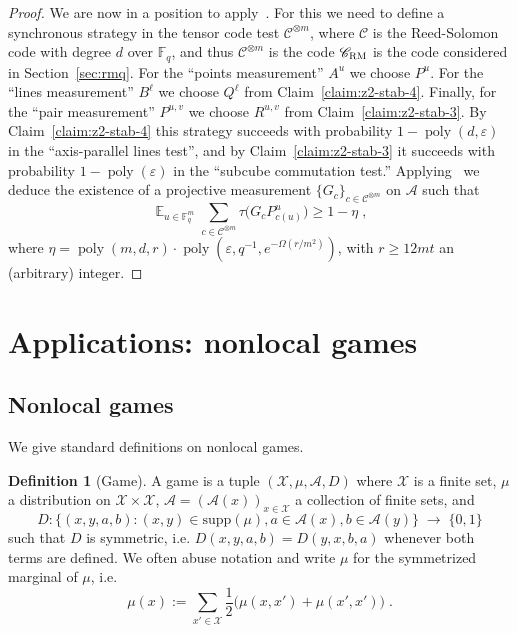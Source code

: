 \documentclass[11pt]{article}
\theoremstyle{definition}
\newtheorem{definition}[theorem]{Definition}
\newcommand{\code}{\mathscr{C}}
\DeclareMathOperator*{\Expectation}{\mathbb{E}}
\newcommand{\Es}[1]{\Expectation_{#1}}
\newcommand{\F}{\ensuremath{\mathbb{F}}}
\newcommand{\mA}{\ensuremath{\mathcal{A}}}
\newcommand{\mX}{\ensuremath{\mathcal{X}}}
\newcommand{\RM}{\ensuremath{\textsc{RM}}}
\DeclareMathOperator{\poly}{poly}
\newcommand{\eps}{\varepsilon}
\begin{document}
\begin{proof}
We are now in a position to apply~\cite[Theorem 4.1]{ji2022quantum}. For this we need to define a synchronous strategy in the tensor code test $\code^{\otimes m}$, where $\code$ is the Reed-Solomon code with degree $d$ over $\F_q$, and thus $\code^{\otimes m}$ is the code $\code_\RM$ is the code considered in Section~\ref{sec:rmq}. For the ``points measurement'' $A^u$ we choose $P^u$. For the ``lines measurement'' $B^\ell$ we choose $Q^\ell$ from Claim~\ref{claim:z2-stab-4}. Finally, for the ``pair measurement'' $P^{u,v}$ we choose $R^{u,v}$ from Claim~\ref{claim:z2-stab-3}. By Claim~\ref{claim:z2-stab-4} this strategy succeeds with probability $1-\poly(d,\eps)$ in the ``axis-parallel lines test'', and by Claim~\ref{claim:z2-stab-3} it succeeds with probability $1-\poly(\eps)$ in the ``subcube commutation test.'' Applying~\cite[Theorem 4.1]{ji2022quantum} we deduce the existence of a projective measurement $\{G_c\}_{c\in\code^{\otimes m}}$ on $\mA$ such that
\[ \Es{u\in\F_q^m} \sum_{c\in\code^{\otimes m}} \tau\big( G_c P^u_{c(u)}\big) \geq 1-\eta\;,\]
where $\eta = \poly(m,d,r) \cdot\poly(\eps,q^{-1},e^{-\Omega(r/m^2)})$, with $r\geq 12mt$ an (arbitrary) integer. 

\end{proof}








\section{Applications: nonlocal games}
	
	
\subsection{Nonlocal games}

We give standard definitions on nonlocal games. 

\begin{definition}[Game]
A game is a tuple $(\mX,\mu,\mA,D)$ where $\mX$ is a finite set, $\mu$ a distribution on $\mX\times \mX$, $\mA=(\mA(x))_{x\in\mX}$ a collection of finite sets, and 
\[ D: \big\{ (x,y,a,b) : (x,y)\in\text{supp}(\mu),a\in\mA(x),b\in\mA(y)\big\} \;\to\;\{0,1\}\]
such that $D$ is symmetric, i.e. $D(x,y,a,b)=D(y,x,b,a)$ whenever both terms are defined. We often abuse notation and write $\mu$ for the symmetrized marginal of $\mu$, i.e.\ 
\[\mu(x) := \sum_{x'\in \mX} \frac{1}{2}\big(\mu(x,x')+\mu(x',x')\big)\;.\]
\end{definition}
\end{document}

